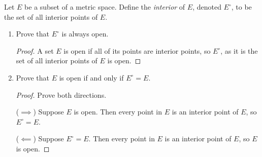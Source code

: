 \documentclass[10pt]{article}
\newenvironment{problem}[2][Problem]{\begin{trivlist}
\item[\hskip \labelsep {\bfseries #1}\hskip \labelsep {\bfseries #2.}]}{\end{trivlist}}
\begin{document}
\newpage

\begin{problem}{4}
	Let $E$ be a subset of a metric space. Define the \emph{interior} of $E$, denoted $E^\circ$, to be the set of all interior points of $E$.
	\begin{enumerate}
		\item Prove that $E^\circ$ is always open.
            \begin{proof}
                A set $E$ is open if all of its points are interior points, so $E^\circ$, as it is the set of all interior points of $E$ is open.
            \end{proof}
		\item Prove that $E$ is open if and only if $E^\circ = E$.
            \begin{proof} Prove both directions.

                ($\implies$) Suppose $E$ is open. Then every point in $E$ is an interior point of $E$, so $E^\circ = E$.

                ($\impliedby$) Suppose $E^\circ = E$. Then every point in $E$ is an interior point of $E$, so $E$ is open.
            \end{proof}


\end{enumerate}
\end{problem}
\end{document}
